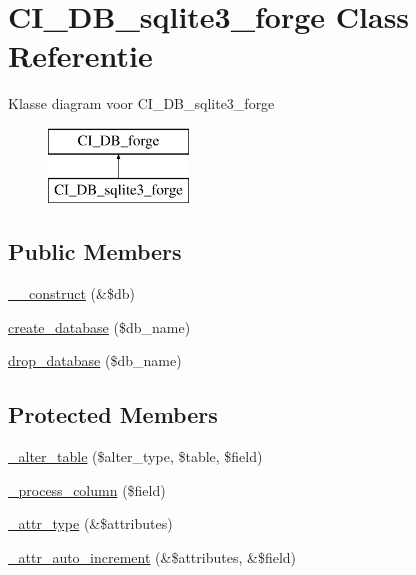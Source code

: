\hypertarget{class_c_i___d_b__sqlite3__forge}{}\section{C\+I\+\_\+\+D\+B\+\_\+sqlite3\+\_\+forge Class Referentie}
\label{class_c_i___d_b__sqlite3__forge}
Klasse diagram voor C\+I\+\_\+\+D\+B\+\_\+sqlite3\+\_\+forge\begin{figure}[H]
\begin{center}
\leavevmode
\includegraphics[height=2.000000cm]{class_c_i___d_b__sqlite3__forge}
\end{center}
\end{figure}
\subsection*{Public Members}
\begin{DoxyCompactItemize}
\item 
\mbox{\hyperlink{class_c_i___d_b__sqlite3__forge_aaf2ef772755ec6f361d44e16cc9ffd69}{\+\_\+\+\_\+construct}} (\&\$db)
\item 
\mbox{\hyperlink{class_c_i___d_b__sqlite3__forge_a902a7267babceb2ce595706f217e00ad}{create\+\_\+database}} (\$db\+\_\+name)
\item 
\mbox{\hyperlink{class_c_i___d_b__sqlite3__forge_a9612987b2d4230de2638d15857e92e67}{drop\+\_\+database}} (\$db\+\_\+name)
\end{DoxyCompactItemize}
\subsection*{Protected Members}
\begin{DoxyCompactItemize}
\item 
\mbox{\hyperlink{class_c_i___d_b__sqlite3__forge_a41c6cae02f2fda8b429ad0afb9509426}{\+\_\+alter\+\_\+table}} (\$alter\+\_\+type, \$table, \$field)
\item 
\mbox{\hyperlink{class_c_i___d_b__sqlite3__forge_a8f38f1c5b5dddecca4befbe393f3f299}{\+\_\+process\+\_\+column}} (\$field)
\item 
\mbox{\hyperlink{class_c_i___d_b__sqlite3__forge_a8553be952084c6f7cdfff370a1d14f6b}{\+\_\+attr\+\_\+type}} (\&\$attributes)
\item 
\mbox{\hyperlink{class_c_i___d_b__sqlite3__forge_a2a013a5932439c3c44f0dad3436525f7}{\+\_\+attr\+\_\+auto\+\_\+increment}} (\&\$attributes, \&\$field)
\end{DoxyCompactItemize}
